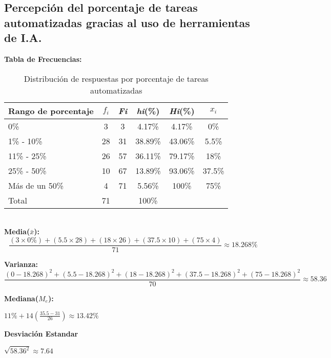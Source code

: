 \subsection{Percepción del porcentaje de tareas automatizadas gracias al uso de herramientas de I.A.}
\noindent\textbf{Tabla de Frecuencias:}
\begin{table}[h!]
	\centering
	\renewcommand{\arraystretch}{1.2}
	\begin{tabular}{l c c c c c}
		\hline
		{Rango de porcentaje} & {\(f_i\)} & \textit{Fi} & \textit{hi}(\%) & \textit{Hi}(\%) & \(x_i\)\\
		\hline
		0\%                  & 3  & 3  & 4.17\%  & 4.17\% & 0\% \\
		1\% - 10\%           & 28 & 31 & 38.89\% & 43.06\% & 5.5\% \\
		11\% - 25\%          & 26 & 57 & 36.11\% & 79.17\% & 18\% \\
		25\% - 50\%          & 10 & 67 & 13.89\% & 93.06\% &37.5\% \\
		Más de un 50\%       & 4  & 71 & 5.56\%  & 100\% & 75\% \\
		\hline
		Total                & 71 &    & 100\%   & & \\
		\hline
	\end{tabular}
	\caption{Distribución de respuestas por porcentaje de tareas automatizadas}
	\label{tabla:porcentaje_IA}
\end{table} \\

\noindent\textbf{Media($\bar{x}$):}
\begin{equation*}
	\frac{(3 \times 0\%) + (5.5 \times 28) + (18 \times 26) + (37.5 \times 10) + (75 \times 4)}{71} \approx 18.268\%
\end{equation*}

\noindent\textbf{Varianza:}
\begin{equation*}
	\frac{(0-18.268)^2 + (5.5-18.268)^2 + (18-18.268)^2 + (37.5 - 18.268)^2 + (75 - 18.268)^2}{70} \approx 58.36
\end{equation*}

\begin{multicols}{2}
	\noindent\textbf{Mediana(\(M_e\)):}
	\begin{center}
		$11\% + 14(\frac{35.5 - 31}{26}) \approx 13.42\%$
	\end{center}
	\columnbreak
	\vfill
	\noindent\textbf{Desviación Estandar}
	\begin{center}
		$\sqrt{58.36^2} \approx 7.64$
	\end{center}
\end{multicols}

